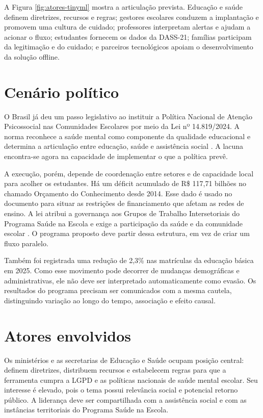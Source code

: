A Figura \ref{fig:atores-tinyml} mostra a articulação prevista. Educação e saúde
definem diretrizes, recursos e regras; gestores escolares conduzem a implantação
e promovem uma cultura de cuidado; professores interpretam alertas e ajudam a
acionar o fluxo; estudantes fornecem os dados da DASS-21; famílias participam da
legitimação e do cuidado; e parceiros tecnológicos apoiam o desenvolvimento da
solução offline.

\section{Cenário político}

O Brasil já deu um passo legislativo ao instituir a Política Nacional de Atenção
Psicossocial nas Comunidades Escolares por meio da Lei nº 14.819/2024. A norma
reconhece a saúde mental como componente da qualidade educacional e determina a
articulação entre educação, saúde e assistência social \cite{brasil14819}. A
lacuna encontra-se agora na capacidade de implementar o que a política prevê.

A execução, porém, depende de coordenação entre setores e de capacidade local
para acolher os estudantes. Há um déficit acumulado de
R\$ 117,71 bilhões no chamado Orçamento do Conhecimento desde 2014. Esse dado é
usado no documento para situar as restrições de financiamento que afetam as
redes de ensino. A lei atribui a governança aos Grupos de Trabalho
Intersetoriais do Programa Saúde na Escola e exige a participação da saúde e da
comunidade escolar \cite{brasil14819}. O programa proposto deve partir dessa
estrutura, em vez de criar um fluxo paralelo.

Também foi registrada uma redução de 2,3\% nas matrículas da educação
básica em 2025. Como esse movimento pode decorrer de mudanças demográficas e
administrativas, ele não deve ser interpretado automaticamente como evasão. Os
resultados do programa precisam ser comunicados com a mesma cautela,
distinguindo variação ao longo do tempo, associação e efeito causal.

\section{Atores envolvidos}

Os ministérios e as secretarias de Educação e Saúde ocupam posição central:
definem diretrizes, distribuem recursos e estabelecem regras para que a
ferramenta cumpra a LGPD e as políticas nacionais de saúde mental escolar. Seu
interesse é elevado, pois o tema possui relevância social e potencial retorno
público. A liderança deve ser compartilhada com a assistência social e com as
instâncias territoriais do Programa Saúde na Escola.

